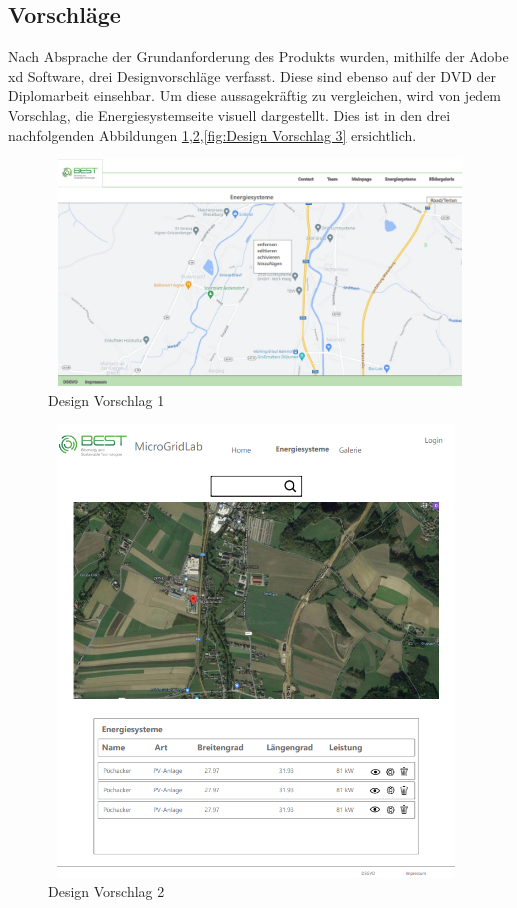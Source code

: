 \subsection{Vorschläge}
Nach Absprache der Grundanforderung des Produkts wurden, mithilfe der Adobe xd Software,  drei Designvorschläge verfasst. Diese sind ebenso auf der DVD der Diplomarbeit einsehbar. Um diese aussagekräftig zu vergleichen, wird von jedem Vorschlag, die Energiesystemseite visuell dargestellt. Dies ist in den drei nachfolgenden Abbildungen \ref{fig:Design Vorschlag 1},\space\ref{fig:Design Vorschlag 2},\space\ref{fig:Design Vorschlag 3} ersichtlich.
\begin{figure}[h]
	\centering
	\includegraphics[height=6cm,width=12cm]{images/DesignVorschlag1}
	\caption{Design Vorschlag 1}
	\label{fig:Design Vorschlag 1}
\end{figure}
\newpage
\begin{figure}[h]
	\centering
	\includegraphics[height=12cm,width=11cm]{images/DesignVorschlag2}
	\caption{Design Vorschlag 2}
	\label{fig:Design Vorschlag 2}
\end{figure}
